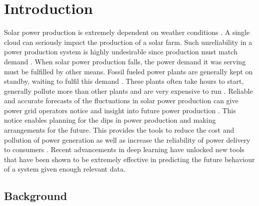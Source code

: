 \chapter{Introduction\label{cha:introduction}}

Solar power production is extremely dependent on weather conditions \cite{lin_temporal_2020, lee_forecasting_2018, jaidee_very_2019, su_machine_2019, jang_solar_2016}. A single cloud can seriously impact the production of a solar farm. Such unreliability in a power production system is highly undesirable since production must match demand \cite{lee_forecasting_2018}. When solar power production falls, the power demand it was serving must be fulfilled by other means. Fossil fueled power plants are generally kept on standby, waiting to fulfil this demand \cite{lee_forecasting_2018}. These plants often take hours to start, generally pollute more than other plants and are very expensive to run \cite{lee_forecasting_2018}.
Reliable and accurate forecasts of the fluctuations in solar power production can give power grid operators notice and insight into future power production \cite{lee_forecasting_2018}. This notice enables planning for the dips in power production and making arrangements for the future. This provides the tools to reduce the cost and pollution of power generation as well as increase the reliability of power delivery to consumers \cite{lee_forecasting_2018}.
Recent advancements in deep learning have unlocked new tools that have been shown to be extremely effective in predicting the future behaviour of a system given enough relevant data.\\


\section{Background}

